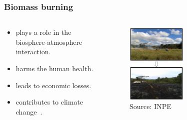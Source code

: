 \documentclass[aspectratio=169]{beamer}
\begin{document}
\begin{frame}
  \frametitle{Biomass burning}
  \begin{columns}
    \begin{column}{0.4\textwidth}
      \begin{itemize}
        \item plays a role in the biosphere-atmosphere interaction.
        \item harms the human health.
        \item leads to economic losses.
        \item contributes to climate change~\cite{thornhill2018}.
      \end{itemize}
    \end{column}
    \begin{column}{0.6\textwidth}
      \begin{figure}
        \centering
        \includegraphics[width=0.5\textwidth]{img/grass_on_fire.png}
        \caption{Source: INPE}
        \label{fig:grass_on_fire}
      \end{figure}
    \end{column}
  \end{columns}
\end{frame}
\end{document}
